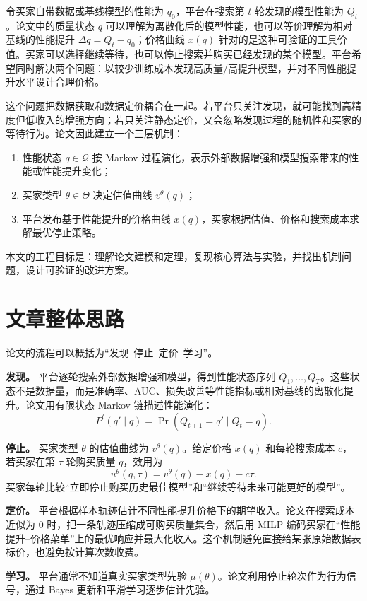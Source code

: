 \documentclass[11pt,a4paper]{ctexart}
\theoremstyle{definition}
\begin{document}
令买家自带数据或基线模型的性能为 $q_0$，平台在搜索第 $t$ 轮发现的模型性能为 $Q_t$。论文中的质量状态 $q$ 可以理解为离散化后的模型性能，也可以等价理解为相对基线的性能提升 $\Delta q=Q_t-q_0$；价格曲线 $x(q)$ 针对的是这种可验证的工具价值。买家可以选择继续等待，也可以停止搜索并购买已经发现的某个模型。平台希望同时解决两个问题：以较少训练成本发现高质量/高提升模型，并对不同性能提升水平设计合理价格。

这个问题把数据获取和数据定价耦合在一起。若平台只关注发现，就可能找到高精度但低收入的增强方向；若只关注静态定价，又会忽略发现过程的随机性和买家的等待行为。论文因此建立一个三层机制：
\begin{enumerate}[label=(\arabic*)]
\item 性能状态 $q\in\mathcal Q$ 按 Markov 过程演化，表示外部数据增强和模型搜索带来的性能或性能提升变化；
\item 买家类型 $\theta\in\Theta$ 决定估值曲线 $v^\theta(q)$；
\item 平台发布基于性能提升的价格曲线 $x(q)$，买家根据估值、价格和搜索成本求解最优停止策略。
\end{enumerate}

本文的工程目标是：理解论文建模和定理，复现核心算法与实验，并找出机制问题，设计可验证的改进方案。

\section{文章整体思路}

论文的流程可以概括为“发现--停止--定价--学习”。

\textbf{发现。} 平台逐轮搜索外部数据增强和模型，得到性能状态序列 $Q_1,\ldots,Q_T$。这些状态不是数据量，而是准确率、AUC、损失改善等性能指标或相对基线的离散化提升。论文用有限状态 Markov 链描述性能演化：
\[
P^t(q'\mid q)=\Pr(Q_{t+1}=q'\mid Q_t=q).
\]

\textbf{停止。} 买家类型 $\theta$ 的估值曲线为 $v^\theta(q)$。给定价格 $x(q)$ 和每轮搜索成本 $c$，若买家在第 $\tau$ 轮购买质量 $q$，效用为
\[
u^\theta(q,\tau)=v^\theta(q)-x(q)-c\tau.
\]
买家每轮比较“立即停止购买历史最佳模型”和“继续等待未来可能更好的模型”。

\textbf{定价。} 平台根据样本轨迹估计不同性能提升价格下的期望收入。论文在搜索成本近似为 0 时，把一条轨迹压缩成可购买质量集合，然后用 MILP 编码买家在“性能提升--价格菜单”上的最优响应并最大化收入。这个机制避免直接给某张原始数据表标价，也避免按计算次数收费。

\textbf{学习。} 平台通常不知道真实买家类型先验 $\mu(\theta)$。论文利用停止轮次作为行为信号，通过 Bayes 更新和平滑学习逐步估计先验。
\end{document}

